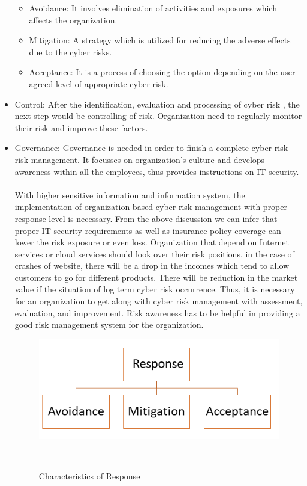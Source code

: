 \documentclass[conference]{IEEEtran}
\begin{document}
\begin{itemize}
\begin{itemize}
\item Avoidance: It involves elimination of activities and exposures which affects the organization.
\item Mitigation: A strategy which is utilized for reducing the adverse effects due to the cyber risks. 
\item Acceptance: It is a process of choosing the option depending on the user agreed level of appropriate cyber risk.
\end{itemize}
\item Control: After the identification, evaluation and processing of cyber risk , the next step would be controlling of risk. Organization need to regularly monitor their risk and improve these factors. 
\item Governance: Governance is needed in order to finish a complete cyber risk risk management. It focusses on organization’s culture and develops awareness within all the employees, thus provides instructions on IT security. 
\\
\\With higher sensitive information and information system, the implementation of organization based cyber risk management with proper response level is necessary. From the above discussion we can infer that proper IT security requirements as well as insurance policy coverage can lower the risk exposure or even loss. Organization that depend on Internet services or cloud services should look over their risk positions, in the case of crashes of website, there will be a drop in the incomes which tend to allow customers to go for different products. There will be reduction in the market value if the situation of log term cyber risk occurrence. Thus, it is necessary for an organization to get along with cyber risk management with assessment, evaluation, and improvement. Risk awareness has to be helpful in providing a good risk management system for the organization.

\begin{figure}
\centering
  \includegraphics[width=0.9\columnwidth]{fig2.png}
  \caption{Characteristics of Response}~\label{fig:figure2}
\end{figure}
\begin{itemize}


\end{itemize}
\end{itemize}
\end{document}

